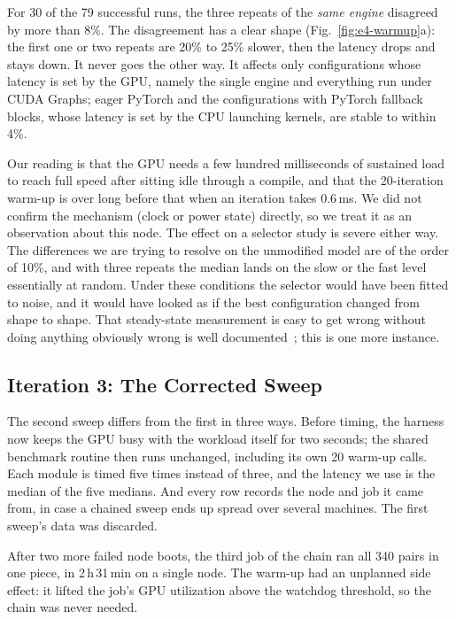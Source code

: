 For 30 of the 79 successful runs, the three repeats of the \emph{same engine}
disagreed by more than 8\%. The disagreement has a clear shape
(Fig.~\ref{fig:e4-warmup}a): the first one or two repeats are 20\% to 25\%
slower, then the latency drops and stays down. It never goes the other way. It
affects only configurations whose latency is set by the GPU, namely the single
engine and everything run under CUDA Graphs; eager PyTorch and the
configurations with PyTorch fallback blocks, whose latency is set by the CPU
launching kernels, are stable to within 4\%.

Our reading is that the GPU needs a few hundred milliseconds of sustained
load to reach full speed after sitting idle through a compile, and that the
20-iteration warm-up is over long before that when an iteration takes
0.6\,ms. We did not confirm the mechanism (clock or power state) directly, so
we treat it as an observation about this node. The effect on a selector study
is severe either way. The differences we are trying to resolve on the
unmodified model are of the order of 10\%, and with three repeats the median
lands on the slow or the fast level essentially at random. Under these
conditions the selector would have been fitted to noise, and it would have
looked as if the best configuration changed from shape to shape. That
steady-state measurement is easy to get wrong without doing anything obviously
wrong is well documented~\cite{georges2007statistically,mytkowicz2009wrong};
this is one more instance.

\subsection{Iteration 3: The Corrected Sweep}
\label{sec:e4-iter3}

The second sweep differs from the first in three ways. Before timing, the
harness now keeps the GPU busy with the workload itself for two seconds; the
shared benchmark routine then runs unchanged, including its own 20 warm-up
calls. Each module is timed five times instead of three, and the latency we
use is the median of the five medians. And every row records the node and job
it came from, in case a chained sweep ends up spread over several machines.
The first sweep's data was discarded.

After two more failed node boots, the third job of the chain ran all 340 pairs
in one piece, in 2\,h\,31\,min on a single node. The warm-up had an unplanned
side effect: it lifted the job's GPU utilization above the watchdog threshold,
so the chain was never needed.

